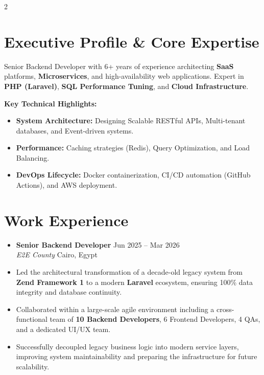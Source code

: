 \documentclass[10pt, a4paper]{article}
\newcommand{\resumeItem}[1]{
  \item\small{
    {#1 \vspace{3pt}} %
  }
}
\newcommand{\resumeSubheading}[4]{
  \vspace{10pt} %
  \item
    \textbf{#1} \hfill {\footnotesize #2} \\ 
    \textit{\small #3} \hfill {\footnotesize #4} \\
    \vspace{4pt}
}
\begin{document}
\begin{paracol}{2}


\section{Executive Profile \& Core Expertise}
Senior Backend Developer with 6+ years of experience architecting \textbf{SaaS} platforms, \textbf{Microservices}, and high-availability web applications. Expert in \textbf{PHP (Laravel)}, \textbf{SQL Performance Tuning}, and \textbf{Cloud Infrastructure}.

\vspace{5pt}
\textbf{Key Technical Highlights:}
\begin{itemize}[leftmargin=0.2in, itemsep=2pt]
    \item \textbf{System Architecture:} Designing Scalable RESTful APIs, Multi-tenant databases, and Event-driven systems.
    \item \textbf{Performance:} Caching strategies (Redis), Query Optimization, and Load Balancing.
    \item \textbf{DevOps Lifecycle:} Docker containerization, CI/CD automation (GitHub Actions), and AWS deployment.
\end{itemize}

\section{Work Experience}
\begin{itemize}[leftmargin=0.15in, label={}]

    \resumeSubheading
      {Senior Backend Developer}{Jun 2025 -- Mar 2026}
      {E2E County}{Cairo, Egypt}
      \resumeItem{Led the architectural transformation of a decade-old legacy system from \textbf{Zend Framework 1} to a modern \textbf{Laravel} ecosystem, ensuring 100\% data integrity and database continuity.}
      \resumeItem{Collaborated within a large-scale agile environment including a cross-functional team of \textbf{10 Backend Developers}, 6 Frontend Developers, 4 QAs, and a dedicated UI/UX team.}
      \resumeItem{Successfully decoupled legacy business logic into modern service layers, improving system maintainability and preparing the infrastructure for future scalability.}


\end{itemize}
\end{paracol}
\end{document}
